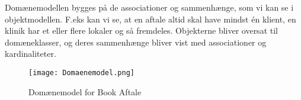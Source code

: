 Domænemodellen bygges på de associationer og sammenhænge, som vi kan se i objektmodellen.
F.eks kan vi se, at en aftale altid skal have mindst én klient, en klinik har et eller flere lokaler og så fremdeles.
Objekterne bliver oversat til domæneklasser, og deres sammenhænge bliver vist med associationer og kardinaliteter.

\begin{figure}[H]
    \caption{Domænemodel for Book Aftale}
    \centering
        \texttt{[image: Domaenemodel.png]}
    \label{system:domaene}
\end{figure}



